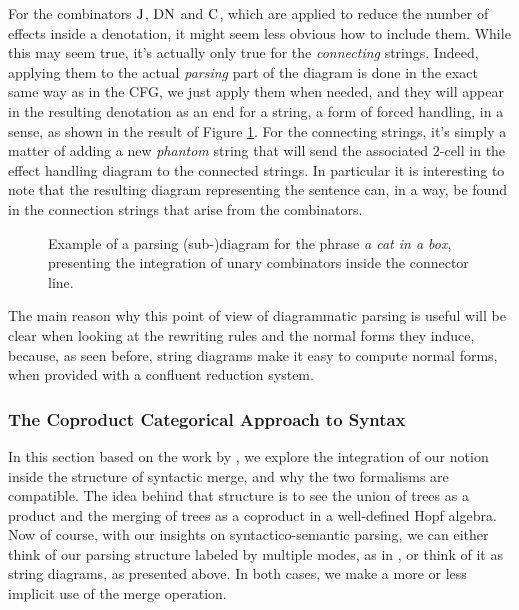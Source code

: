 \medskip

For the combinators $\text{J}$, $\text{DN}$ and $\text{C}$, which are applied to
reduce the number of effects inside a denotation, it might seem less obvious
how to include them.
While this may seem true, it's actually only true for the \emph{connecting}
strings.
Indeed, applying them to the actual \emph{parsing} part of the diagram is done
in the exact same way as in the CFG, we just apply them when needed, and they
will appear in the resulting denotation as an end for a string, a form of
forced handling, in a sense, as shown in the result of Figure
\ref{fig:parsing-diagram2}.
For the connecting strings, it's simply a matter of adding a new \emph{phantom}
string that will send the associated $2$-cell in the effect handling diagram to
the connected strings.
In particular it is interesting to note that the resulting diagram representing
the sentence can, in a way, be found in the connection strings that arise from
the combinators.

\begin{figure}
	\centering
	
	\caption{Example of a parsing (sub-)diagram for the phrase
		\emph{a cat in a box}, presenting the integration of unary combinators
		inside the connector line.}
	\label{fig:parsing-diagram2}
\end{figure}

The main reason why this point of view of diagrammatic parsing is useful
will be clear when looking at the rewriting rules and the normal forms they
induce, because, as seen before, string diagrams make it easy to compute
normal forms, when provided with a confluent reduction system.

\subsubsection{The Coproduct Categorical Approach to Syntax}
\label{subsubsec:coprod}
In this section based on the work by
,
we explore the integration of our notion inside the structure of syntactic
merge, and why the two formalisms are compatible.
The idea behind that structure is to see the union of trees as a product and
the merging of trees as a coproduct in a well-defined Hopf algebra.
Now of course, with our insights on syntactico-semantic parsing, we can either
think of our parsing structure labeled by multiple modes, as in
\cite{bumfordEffectdrivenInterpretationFunctors2025}, or think of it as string
diagrams, as presented above.
In both cases, we make a more or less implicit use of the merge operation.

